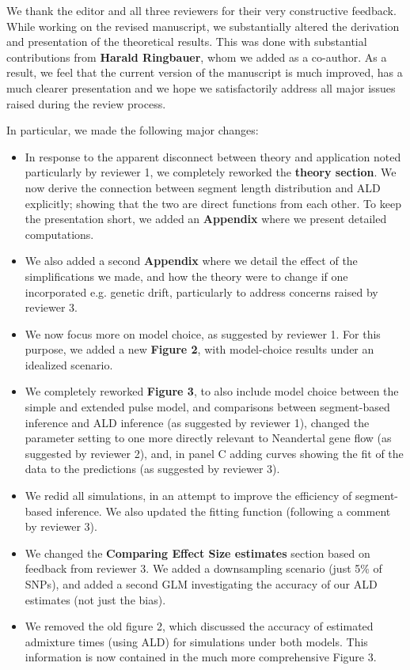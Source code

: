 \documentclass[11pt]{article}
\begin{document}
We thank the editor and all three reviewers for their very constructive feedback. While working on the revised manuscript, we substantially altered the derivation and presentation of the theoretical results. This was done with substantial contributions from \textbf{Harald Ringbauer}, whom we added as a co-author. As a result, we feel that the current version of the manuscript is much improved, has a much clearer presentation and  we hope we satisfactorily address all major issues raised during the review process.

In particular, we made the following major changes:
\begin{itemize}
    \item In response to the apparent disconnect between theory and application noted particularly by reviewer 1, we completely reworked the \textbf{theory section}. We now derive the connection between segment length distribution and ALD explicitly; showing that the two are direct functions from each other. To keep the presentation short, we added an \textbf{Appendix} where we present detailed computations.
    \item We also added a second \textbf{Appendix} where we detail the effect of the simplifications we made, and how the theory were to change if one incorporated e.g. genetic drift, particularly to address concerns raised by reviewer 3.
    \item We now focus more on model choice, as suggested by reviewer 1. For this purpose, we added a new \textbf{Figure 2}, with model-choice results under an idealized scenario. 
    \item We completely reworked \textbf{Figure 3}, to also include model choice between the simple and extended pulse model, and comparisons between segment-based inference and ALD inference (as suggested by reviewer 1), changed the parameter setting to one more directly relevant to Neandertal gene flow (as suggested by reviewer 2), and, in panel C adding curves showing the fit of the data to the predictions (as suggested by reviewer 3).
    \item We redid all simulations, in an attempt to improve the efficiency of segment-based inference. We also updated the fitting function (following a comment by reviewer 3).
    \item We changed the \textbf{Comparing Effect Size estimates} section based on feedback from reviewer 3. We added a downsampling scenario (just 5\% of SNPs), and added a second GLM investigating the accuracy of our ALD estimates (not just the bias). 
    \item We removed the old figure 2, which discussed the accuracy of estimated admixture times (using ALD) for simulations under both models. This information is now contained in the much more comprehensive Figure 3. 
\end{itemize}
\end{document}
